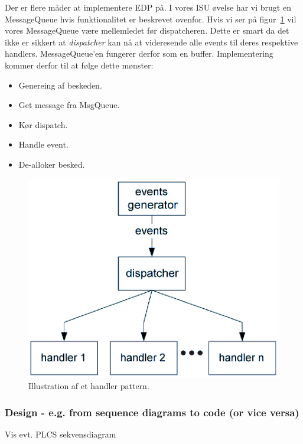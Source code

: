 Der er flere måder at implementere EDP på. I vores ISU øvelse har vi brugt en MessageQueue hvis funktionalitet er beskrevet ovenfor.
Hvis vi ser på figur~\ref{fig:handlPat} vil vores MessageQueue være mellemledet før dispatcheren. Dette er smart da det ikke er sikkert at \textit{dispatcher} kan nå at videresende alle events til deres respektive handlers. MessageQueue'en fungerer derfor som en buffer.
Implementering kommer derfor til at følge dette mønster:
\begin{itemize}
	\item Genereing af beskeden.
	\item Get message fra MsgQueue.
	\item Kør dispatch.
	\item Handle event.
	\item De-alloker besked.
\end{itemize}

\begin{figure}[h]
	\centering
	\includegraphics[width=0.6\linewidth]{figs/spm3/handlersPattern}
	\caption{Illustration af et handler pattern.}
	\label{fig:handlPat}
\end{figure}

\subsubsection{Design - e.g. from sequence diagrams to code (or vice versa)}
Vis evt. PLCS sekvensdiagram